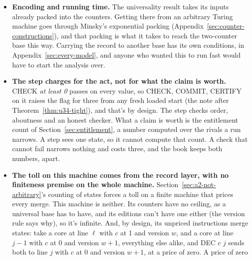 \documentclass[11pt,twoside]{article}
\theoremstyle{thielethm}
\theoremstyle{thieledef}
\theoremstyle{thieledef}
\theoremstyle{thieledef}
\theoremstyle{thielethm}
\theoremstyle{thieleobs}
\theoremstyle{thielethm}
\begin{document}
\begin{itemize}
computably presented Thiele machine, with its reading decided by a program, its record carried as
a latch, and its ledger matched to within a surcharge of at most two when its reading starts at
no, and of three when it starts at yes. When the guest certifies with a ledger below three, no program on
that host, run from a clean start, matches its ledger exactly. A
machine outside that class, with a reading no program decides, isn't covered by either. The
simpler host with the built-in guest step (Appendix~\ref{sec:simpler-host}) pays one per guest step whatever the step was, so its
ledger is at least the guest's and usually more; $U$'s is exact, and $U_P$'s is exact up to the
surcharge.
\item \textbf{Encoding and running time.} The universality result takes its inputs already
packed into the counters. Getting there from an arbitrary Turing machine goes through
Minsky's exponential packing (Appendix~\ref{sec:counter-constructions}), and that packing is
what it takes to reach the two-counter base this way. Carrying the record to another base has
its own conditions, in Appendix~\ref{sec:every-model}, and anyone who wanted this to run fast would have to
start the analysis over.
\item \textbf{The step charges for the act, not for what the claim is worth.} CHECK \emph{at
least 0} passes on every value, so CHECK, COMMIT, CERTIFY on it raises the flag for three from
any fresh loaded start (the note after Theorem~\ref{thm:u34-tight}), and that's by design. The
step checks order, aboutness and an honest checker. What a claim is worth is the entitlement
count of Section~\ref{sec:entitlement}, a number computed over the rivals a run narrows. A
step sees one state, so it cannot compute that count. A check that cannot fail narrows nothing
and costs three, and the book keeps both numbers, apart.
\item \textbf{The toll on this machine comes from the record layer, with no finiteness premise on the whole machine.}
Section~\ref{sec:a2-not-arbitrary}'s counting of states forces a toll on a finite machine that prices
every merge. This machine is neither. Its counters have no ceiling, as a universal base has to have, and its editions can't have one either (the version rule says why), so it's infinite. And, by design, its unpriced instructions merge states: take a core at line $\ell$ with $c$ at 1 and version
$w$, and a core at line $j - 1$ with $c$ at 0 and version $w + 1$, everything else alike, and
DEC $c$ $j$ sends both to line $j$ with $c$ at 0 and version $w + 1$, at a price of zero. A price of zero

\end{itemize}
\end{document}
